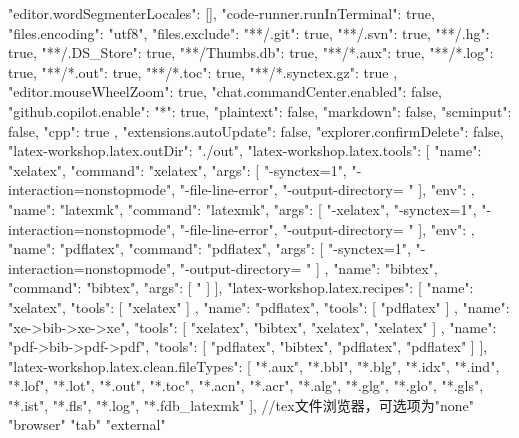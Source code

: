 {
    "editor.wordSegmenterLocales": [],
    "code-runner.runInTerminal": true,
    "files.encoding": "utf8",
    "files.exclude": {
        "**/.git": true,
        "**/.svn": true,
        "**/.hg": true,
        "**/.DS_Store": true,
        "**/Thumbs.db": true,
        "**/*.aux": true,
        "**/*.log": true,
        "**/*.out": true,
        "**/*.toc": true,
        "**/*.synctex.gz": true
    },
    "editor.mouseWheelZoom": true,
    "chat.commandCenter.enabled": false,
    "github.copilot.enable": {
        "*": true,
        "plaintext": false,
        "markdown": false,
        "scminput": false,
        "cpp": true
    },
    "extensions.autoUpdate": false,
    "explorer.confirmDelete": false,
    "latex-workshop.latex.outDir": "./out",
    "latex-workshop.latex.tools": [
    {
        "name": "xelatex",
        "command": "xelatex",
        "args": [
            "-synctex=1",
            "-interaction=nonstopmode",
            "-file-line-error",
            "-output-directory=%
            "%
        ],
        "env": {}
    },	
    {
        "name": "latexmk",
        "command": "latexmk",
        "args": [
            "-xelatex",
            "-synctex=1",
            "-interaction=nonstopmode",
            "-file-line-error",
            "-output-directory=%
            "%
        ],
        "env": {}
    },
    {
        "name": "pdflatex",
        "command": "pdflatex",
        "args": [
            "-synctex=1",
            "-interaction=nonstopmode",
            "-output-directory=%
            "%
        ]
    },
    {
        "name": "bibtex",
        "command": "bibtex",
        "args": [
            "%
        ]
    }
],
"latex-workshop.latex.recipes": [
    {
        "name": "xelatex",
        "tools": [
            "xelatex"
        ]
    },
    {
        "name": "pdflatex",
        "tools": [
            "pdflatex"
        ]
    },
    {
        "name": "xe->bib->xe->xe",
        "tools": [
            "xelatex",
            "bibtex",
            "xelatex",
            "xelatex"
        ]
    },
    {
        "name": "pdf->bib->pdf->pdf",
        "tools": [
            "pdflatex",
            "bibtex",
            "pdflatex",
            "pdflatex"
        ]
    }
],
"latex-workshop.latex.clean.fileTypes": [
    "*.aux",
    "*.bbl",
    "*.blg",
    "*.idx",
    "*.ind",
    "*.lof",
    "*.lot",
    "*.out",
    "*.toc",
    "*.acn",
    "*.acr",
    "*.alg",
    "*.glg",
    "*.glo",
    "*.gls",
    "*.ist",
    "*.fls",
    "*.log",
    "*.fdb_latexmk"
],
//tex文件浏览器，可选项为"none" "browser" "tab" "external"
}
